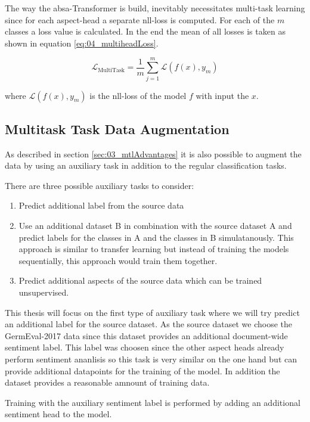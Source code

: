 The way the \gls{absa}-Transformer is build, inevitably necessitates multi-task learning since for each aspect-head a separate \gls{nll}-loss is computed. For each of the $m$ classes a loss value is calculated. In the end the mean of all losses is taken as shown in equation \ref{eq:04_multiheadLoss}.

\begin{equation}
\mathcal{L}_\text{MultiTask} = \frac{1}{m}\sum_{j=1}^{m}\mathcal{L}(f(x), y_m)
\label{eq:04_multiheadLoss}
\end{equation}

where $\mathcal{L}(f(x), y_m)$ is the \gls{nll}-loss of the model $f$ with input the $x$.

\subsection*{Multitask Task Data Augmentation}

As described in section \ref{sec:03_mtlAdvantages} it is also possible to augment the data by using an auxiliary task in addition to the regular classification tasks.

There are three possible auxiliary tasks to consider:


\begin{enumerate}
	\item Predict additional label from the source data
	\item Use an additional dataset B in combination with the source dataset A and predict labels for the classes in A and the classes in B simulatanously. This approach is similar to transfer learning but instead of training the models sequentially, this approach would train them together.
	\item Predict additional aspects of the source data which can be trained unsupervised.
\end{enumerate}

This thesis will focus on the first type of auxiliary task where we will try predict an additional label for the source dataset. As the source dataset we choose the GermEval-2017 data since this dataset provides an additional document-wide sentiment label. This label was choosen since the other aspect heads already perform sentiment ananlisis so this task is very similar on the one hand but can provide additional datapoints for the training of the model. In addition the dataset provides a reasonable amnount of training data.

Training with the auxiliary sentiment label is performed by adding an additional sentiment head to the model.

